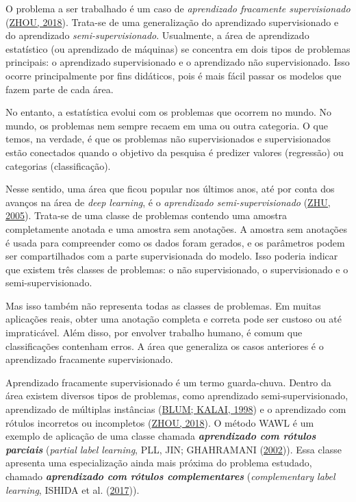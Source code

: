 \documentclass[12pt,twoside,brazilian]{book}
\begin{document}
O problema a ser trabalhado é um caso de \emph{aprendizado fracamente
supervisionado} (\protect\hyperlink{ref-zhou2018}{ZHOU, 2018}). Trata-se
de uma generalização do aprendizado supervisionado e do aprendizado
\emph{semi-supervisionado}. Usualmente, a área de aprendizado
estatístico (ou aprendizado de máquinas) se concentra em dois tipos de
problemas principais: o aprendizado supervisionado e o aprendizado não
supervisionado. Isso ocorre principalmente por fins didáticos, pois é
mais fácil passar os modelos que fazem parte de cada área.

No entanto, a estatística evolui com os problemas que ocorrem no mundo.
No mundo, os problemas nem sempre recaem em uma ou outra categoria. O
que temos, na verdade, é que os problemas não supervisionados e
supervisionados estão conectados quando o objetivo da pesquisa é
predizer valores (regressão) ou categorias (classificação).

Nesse sentido, uma área que ficou popular nos últimos anos, até por
conta dos avanços na área de \emph{deep learning}, é o \emph{aprendizado
semi-supervisionado} (\protect\hyperlink{ref-zhu2005}{ZHU, 2005}).
Trata-se de uma classe de problemas contendo uma amostra completamente
anotada e uma amostra sem anotações. A amostra sem anotações é usada
para compreender como os dados foram gerados, e os parâmetros podem ser
compartilhados com a parte supervisionada do modelo. Isso poderia
indicar que existem três classes de problemas: o não supervisionado, o
supervisionado e o semi-supervisionado.

Mas isso também não representa todas as classes de problemas. Em muitas
aplicações reais, obter uma anotação completa e correta pode ser custoso
ou até impraticável. Além disso, por envolver trabalho humano, é comum
que classificações contenham erros. A área que generaliza os casos
anteriores é o aprendizado fracamente supervisionado.

Aprendizado fracamente supervisionado é um termo guarda-chuva. Dentro da
área existem diversos tipos de problemas, como aprendizado
semi-supervisionado, aprendizado de múltiplas instâncias
(\protect\hyperlink{ref-blum1998}{BLUM; KALAI, 1998}) e o aprendizado
com rótulos incorretos ou incompletos
(\protect\hyperlink{ref-zhou2018}{ZHOU, 2018}). O método WAWL é um
exemplo de aplicação de uma classe chamada \textbf{\emph{aprendizado com
rótulos parciais}} (\emph{partial label learning}, PLL, JIN; GHAHRAMANI
(\protect\hyperlink{ref-jin2002}{2002})). Essa classe apresenta uma
especialização ainda mais próxima do problema estudado, chamado
\textbf{\emph{aprendizado com rótulos complementares}}
(\emph{complementary label learning}, ISHIDA et al.
(\protect\hyperlink{ref-ishida2017}{2017})).
\end{document}
